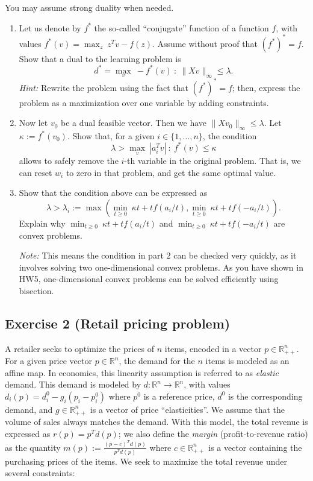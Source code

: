 \documentclass[11pt]{article}
\begin{document}
You may assume strong duality when needed.
\begin{enumerate}
\item Let us denote by $f^*$ the so-called ``conjugate'' function of a function $f$, with values $f^*(v) = \max_{z} \: z^T v - f(z)$. Assume without proof that ${(f^*)}^* = f$. Show that a dual to the learning problem is
\[
d^* = \max_v \: -f^*(v) ~:~ \|Xv\|_\infty \le \lambda.
\]
{\em Hint:} Rewrite the problem using the fact that $(f^*)^* = f$; then, express the problem as a maximization over one variable by adding constraints.

\item Now let $v_0$ be a dual feasible vector. Then we have $\|Xv_0\|_\infty \le \lambda$. Let $\kappa := f^*(v_0)$. Show that, for a given $i \in \{ 1, \ldots, n\}$,  the condition
\[
\lambda > \max_{v} \: |a_i^T v| ~:~  f^*(v) \le \kappa
\]
allows to safely remove the $i$-th variable in the original problem. That is, we can reset $w_i$ to zero in that problem, and get the same optimal value.

\item Show that the condition above can be expressed as
\[
\lambda > \lambda_i := \max\left( \min_{t\geq 0} \: \kappa t + t f(a_i/t), \min_{t \geq 0} \: \kappa t + t f(-a_i/t) \right).
\]
Explain why $\min_{t \geq 0} \: \kappa t + t f(a_i/t)$ and $\min_{t \geq 0} \: \kappa t + t f(-a_i/t)$ are convex problems.

{\em Note:} This means the condition in part 2 can be checked very quickly, as it involves solving two one-dimensional convex problems. As you have shown in HW5, one-dimensional convex problems can be solved efficiently using bisection.

\end{enumerate}

\begin{solution}
\end{solution}

\newpage
\subsection*{Exercise 2 (Retail pricing problem)}

A retailer seeks to optimize the prices of $n$ items, encoded in a vector $p \in \mathbb{R}_{++}^{n}$. For a given price vector $p \in \mathbb{R}^{n}$, the demand for the $n$ items is modeled as an affine map. In economics, this linearity assumption is referred to as \emph{elastic} demand. This demand is modeled by $d : \mathbb{R}^{n} \rightarrow \mathbb{R}^{n}$, with values \( d_i(p) = d_i^0 - g_i (p_i-p_i^0) \) where $p^0$ is a reference price, $d^0$ is the corresponding demand, and $g \in \mathbb{R}_{++}^{n}$ is a vector of price ``elasticities''. We assume that the volume of sales always matches the demand. With this model, the total revenue is expressed as
$r(p) = p^Td(p)$; we also define the \emph{margin} (profit-to-revenue ratio) as the quantity $ m(p) :=\frac{(p-c)^Td(p)}{p^Td(p)} $ where $c \in \mathbb{R}_{++}^{n}$ is a vector containing the purchasing prices of the items. We seek to maximize the total revenue under several constraints:
\end{document}
